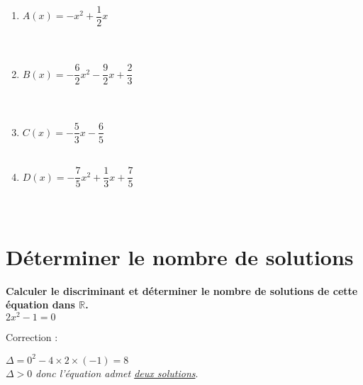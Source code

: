 \documentclass[11pt]{article}
\begin{document}
\begin{exercice}
  \begin{multicols}{2}
    \begin{enumerate}
    \item $A(x) = -x^2+\dfrac{1}{2}x$ \\ \dtf \\ \dtf \\ \dtf
    \item $B(x) = -\dfrac{6}{2}x^2-\dfrac{9}{2}x+\dfrac{2}{3}$ \\ \dtf
      \\ \dtf \\ \dtf
    \item $C(x) = -\dfrac{5}{3}x-\dfrac{6}{5}$ \\ \dtf \\ \dtf
    \item $D(x) = -\dfrac{7}{5}x^2+\dfrac{1}{3}x+\dfrac{7}{5}$ \\ \dtf
      \\ \dtf \\ \dtf
    \end{enumerate}
  \end{multicols}
\end{exercice}

\newpage

\section{Déterminer le nombre de solutions}

\begin{exercice}
\textbf{Calculer le discriminant et déterminer le nombre de solutions de cette
équation dans $\mathbb{R}$.} \\
$2x^2-1=0$

Correction :\\
\begin{minipage}[t]{\linewidth}$\Delta = 0^2-4\times2\times(-1)=8$\\$\Delta>0$ \textit{donc l'équation admet \underline{deux solutions}}.\end{minipage}
\end{exercice}
\end{document}
